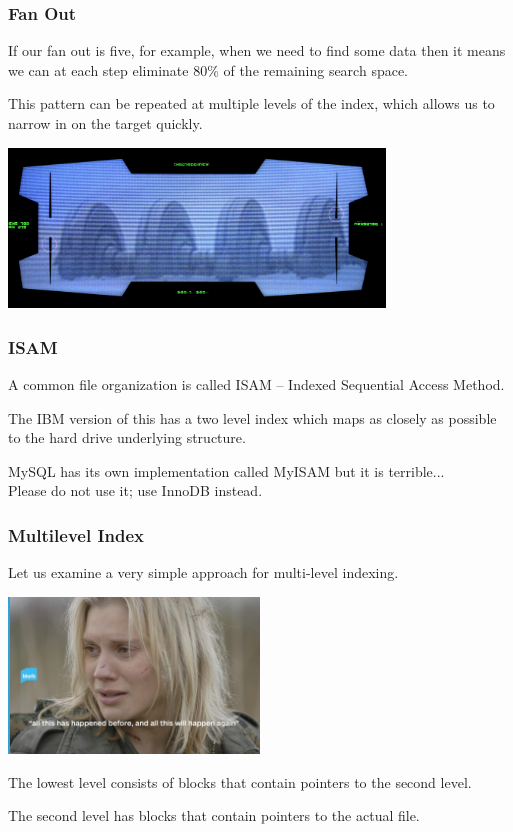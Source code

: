 \begin{frame}
\frametitle{Fan Out}

If our fan out is five, for example, when we need to find some data then it means we can at each step eliminate 80\% of the remaining search space.

This pattern can be repeated at multiple levels of the index, which allows us to narrow in on the target quickly.

\begin{center}
	\includegraphics[width=0.75\textwidth]{images/shield-generator.jpg}
\end{center}

\end{frame}

\begin{frame}
\frametitle{ISAM}

A common file organization is called ISAM -- Indexed Sequential Access Method. 

The IBM version of this has a two level index which maps as closely as possible to the hard drive underlying structure. 

MySQL has its own implementation called MyISAM but it is terrible...\\
\quad Please do not use it; use InnoDB instead. 

\end{frame}

\begin{frame}
\frametitle{Multilevel Index}
Let us examine a very simple approach for multi-level indexing. 

\begin{center}
	\includegraphics[width=0.5\textwidth]{images/happenedbefore.jpg}
\end{center}


The lowest level consists of blocks that contain pointers to the second level. 

The second level has blocks that contain pointers to the actual file. 



\end{frame}

